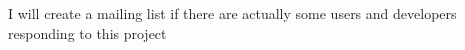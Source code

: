 I will create a mailing list if there are actually some users and developers responding to this project 